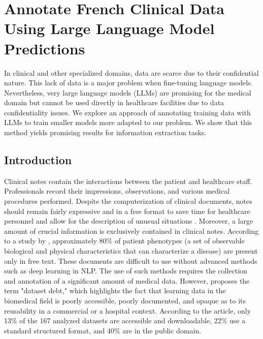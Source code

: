 \chapter{Annotate French Clinical Data Using Large Language Model Predictions}

In clinical and other specialized domains, data are scarce due to their confidential nature. This lack of data is a major problem when fine-tuning language models.
Nevertheless, very large language models (LLMs) are promising for the medical domain but cannot be used directly in healthcare facilities due to data confidentiality issues. We explore an approach of annotating training data with LLMs to train smaller models more adapted to our problem. 
We show that this method yields promising results for information extraction tasks.

\section{Introduction}
Clinical notes contain the interactions between the patient and healthcare staff. Professionals record their impressions, observations, and various medical procedures performed. Despite the computerization of clinical documents, notes should remain fairly expressive and in a free format to save time for healthcare personnel and allow for the description of unusual situations \citep{Rosenbloom2011DataDocumentation}. Moreover, a large amount of crucial information is exclusively contained in clinical notes. According to a study by \citet{Escudie2017ADisease}, approximately 80\% of patient phenotypes (a set of observable biological and physical characteristics that can characterize a disease) are present only in free text. These documents are difficult to use without advanced methods such as deep learning in NLP. The use of such methods requires the collection and annotation of a significant amount of medical data. However, \citet{Fries2022DatasetModeling} proposes the term "dataset debt," which highlights the fact that learning data in the biomedical field is poorly accessible, poorly documented, and opaque as to its reusability in a commercial or a hospital context. According to the article, only 13\% of the 167 analyzed datasets are accessible and downloadable, 22\% use a standard structured format, and 40\% are in the public domain.

